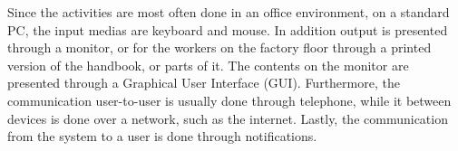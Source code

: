 Since the activities are most often done in an office environment, on a standard PC, the input medias are keyboard and mouse.
In addition output is presented through a monitor, or for the workers on the factory floor through a printed version of the handbook, or parts of it.
The contents on the monitor are presented through a Graphical User Interface (GUI).
Furthermore, the communication user-to-user is usually done through telephone, while it between devices is done over a network, such as the internet.
Lastly, the communication from the system to a user is done through notifications.

